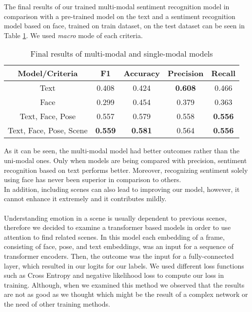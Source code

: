 The final results of our trained multi-modal sentiment recognition model in comparison with a pre-trained model on the text and a sentiment recognition model based on face, trained on train dataset, on the test dataset can be seen in Table \ref{table:results}. We used \textit{macro} mode of each criteria.

\begin{center}
	\begin{table}[h!]
		\begin{tabular}{|c|c c c c|} 
			\hline
			Model/Criteria & F1 & Accuracy & Precision & Recall \\
			\hline\hline
			Text & 0.408 & 0.424 & \textbf{0.608} & 0.466 \\
			\hline
			Face & 0.299 & 0.454 & 0.379 & 0.363 \\
			\hline
			Text, Face, Pose & 0.557 & 0.579 & 0.558 & \textbf{0.556} \\ \hline
			Text, Face, Pose, Scene & \textbf{0.559} & \textbf{0.581} & 0.564 & \textbf{0.556} \\
			\hline
		\end{tabular}
		\caption{Final results of multi-modal and single-modal models}
		\label{table:results}
	\end{table}
\end{center}

As it can be seen, the multi-modal model had better outcomes rather than the uni-modal ones. Only when models are being compared with precision, sentiment recognition based on text performs better. Moreover, recognizing sentiment solely using face has never been superior in comparison to others.\\
In addition, including scenes can also lead to improving our model, however, it cannot enhance it extremely and it contributes mildly.


\paragraph{} 
Understanding emotion in a scene is usually dependent to previous scenes, therefore we decided to examine a transformer based models in order to use attention to find related scenes.
In this model each embedding of a frame, consisting of face, pose, and text embeddings, was an input for a sequence of transformer encoders. Then, the outcome was the input for a fully-connected layer, which resulted in our logits for our labels. We used different loss functions such as Cross Entropy and negative likelihood loss to compute our loss in training. Although, when we examined this method we observed that the results are not as good as we thought which might be the result of a complex network or the need of other training methods.

